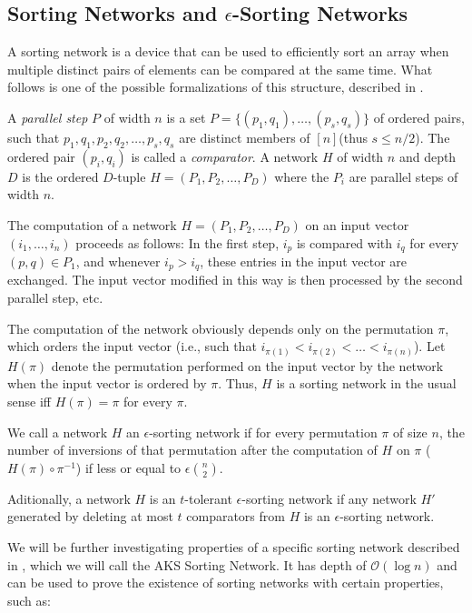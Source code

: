 \documentclass{article}
\def\bigo{\mathcal{O}}
\begin{document}
\subsection{Sorting Networks and $\epsilon$-Sorting Networks}

A sorting network is a device that can be used to efficiently sort an array when multiple distinct pairs of elements can be compared at the same time. What follows is one of the possible formalizations of this structure, described in \cite{epsnets}.
\begin{displayquote}

A \textit{parallel step} $P$ of width $n$ is a set $P=\{(p_1,q_1),\dots,(p_s,q_s)\}$ of ordered pairs, such that $p_1,q_1,p_2,q_2,\dots,p_s,q_s$ are distinct members of $[n]$(thus $s\leq n/2$). The ordered pair $(p_i,q_i)$ is called a \textit{comparator}. A network $H$ of width $n$ and depth $D$ is the ordered $D$-tuple $H=(P_1,P_2,\dots,P_D)$ where the $P_i$ are parallel steps of width $n$.

The computation of a network $H = (P_1, P_2,\dots, P_D)$ on an input vector
$(i_1,\dots, i_n)$ proceeds as follows: In the first step, $i_p$ is compared with $i_q$ for every
$(p, q) \in P_1$, and whenever $i_p > i_q$, these entries in the input vector are exchanged.
The input vector modified in this way is then processed by the second parallel step,
etc. 

The computation of the network obviously depends only on the permutation $\pi$,
which orders the input vector (i.e., such that $i_{\pi(1)}<i_{\pi(2)}<\dots<i_{\pi(n)}$). Let $H(\pi)$
denote the permutation performed on the input vector by the network when the
input vector is ordered by $\pi$. Thus, $H$ is a sorting network in the usual sense iff
$H(\pi) = \pi$ for every $\pi$. 

\end{displayquote}

We call a network $H$ an $\epsilon$-sorting network if for every permutation $\pi$ of size $n$, the number of inversions of that permutation after the computation of $H$ on $\pi$ ($H(\pi)\circ \pi^{-1}$) if less or equal to $\epsilon {n \choose 2}$. 

Aditionally, a network $H$ is an $t$-tolerant $\epsilon$-sorting network if any network $H'$ generated by deleting at most $t$ comparators from $H$ is an $\epsilon$-sorting network.

We will be further investigating properties of a specific sorting network described in \cite{AKS}, which we will call the AKS Sorting Network. It has depth of $\bigo(\log n)$ and can be used to prove the existence of sorting networks with certain properties, such as:
\end{document}
